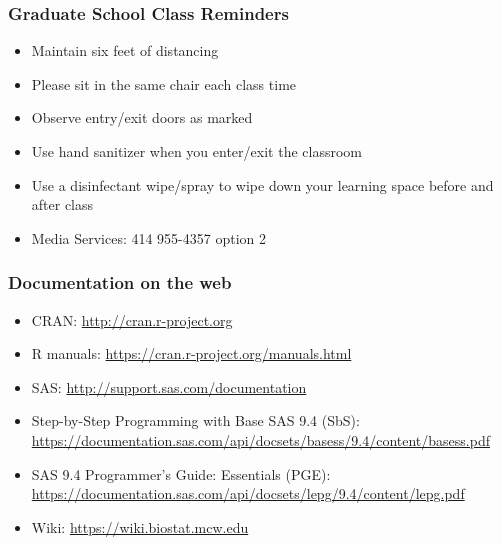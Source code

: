 \documentclass[11pt,pdftex,dvipsnames,usenames,helvetica]{beamer}
\begin{document}
\boldmath

\begin{frame}
\frametitle{Graduate School Class Reminders}

\begin{itemize}
\item Maintain six feet of distancing
\item Please sit in the same chair each class time
\item Observe entry/exit doors as marked
\item Use hand sanitizer when you enter/exit the classroom
\item Use a disinfectant wipe/spray to wipe down your learning space
  before and after class
\item Media Services: 414 955-4357 option 2
\end{itemize}

\end{frame}

\begin{frame}
\frametitle{Documentation on the web}

\begin{itemize}
\item CRAN: \url{http://cran.r-project.org}
\item R manuals: \url{https://cran.r-project.org/manuals.html}
\item SAS: \url{http://support.sas.com/documentation}
\item Step-by-Step Programming with Base SAS 9.4 (SbS): \\
\url{https://documentation.sas.com/api/docsets/basess/9.4/content/basess.pdf}
\item SAS 9.4 Programmer’s Guide: Essentials (PGE): \\
\url{https://documentation.sas.com/api/docsets/lepg/9.4/content/lepg.pdf}
\item Wiki: \url{https://wiki.biostat.mcw.edu}
\end{itemize}

\end{frame}
\end{document}
